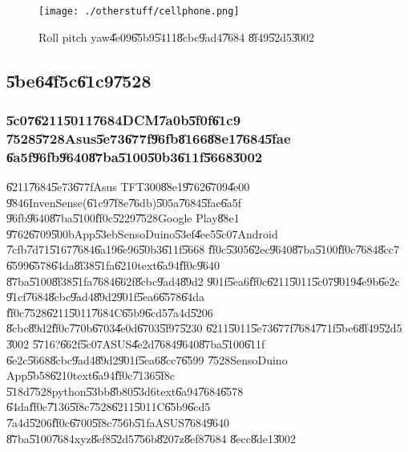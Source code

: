 \clearpage%

\begin{figure}[th]
\caption{Roll pitch yaw\U{4e09}\U{65b9}\U{5411}\U{8cbc}\U{9ad4}\U{7684}%
\U{8f49}\U{52d5}\U{3002}}
\begin{center}
\texttt{[image: ./otherstuff/cellphone.png]}
\end{center}
\end{figure}

\bigskip 

\subsection{\U{5be6}\U{4f5c}\U{61c9}\U{7528}}

\subsubsection{\U{5c07}\U{6211}\U{5011}\U{7684}DCM\U{7a0b}\U{5f0f}\U{61c9}%
\U{7528}\U{5728}Asus\U{5e73}\U{677f}\U{96fb}\U{8166}\U{88e1}\U{7684}\U{5fae}%
\U{6a5f}\U{96fb}\U{9640}\U{87ba}\U{5100}\U{50b3}\U{611f}\U{5668}\U{3002}}

\U{6211}\U{7684}\U{5e73}\U{677f}Asus TFT300\U{88e1}\U{9762}\U{6709}\U{4e00}%
\U{9846}InvenSense(\U{61c9}\U{7f8e}\U{76db})\U{505a}\U{7684}\U{5fae}\U{6a5f}%
\U{96fb}\U{9640}\U{87ba}\U{5100}\U{ff0c}\U{5229}\U{7528}Google Play\U{88e1}%
\U{9762}\U{6709}\U{500b}App\U{53eb}SensoDuino\U{53ef}\U{4ee5}\U{5c07}Android%
\U{7cfb}\U{7d71}\U{5167}\U{7684}\U{6a19}\U{6e96}\U{50b3}\U{611f}\U{5668}%
\U{ff0c}\U{5305}\U{62ec}\U{9640}\U{87ba}\U{5100}\U{ff0c}\U{7684}\U{8cc7}%
\U{6599}\U{6578}\U{64da}\U{8f38}\U{51fa}\U{6210}text\U{6a94}\U{ff0c}\U{9640}%
\U{87ba}\U{5100}\U{8f38}\U{51fa}\U{7684}\U{662f}\U{8cbc}\U{9ad4}\U{89d2}%
\U{901f}\U{5ea6}\U{ff0c}\U{6211}\U{5011}\U{5c07}\U{9019}\U{4e9b}\U{6e2c}%
\U{91cf}\U{7684}\U{8cbc}\U{9ad4}\U{89d2}\U{901f}\U{5ea6}\U{6578}\U{64da}%
\U{ff0c}\U{7528}\U{6211}\U{5011}\U{7684}C\U{65b9}\U{6cd5}\U{7a4d}\U{5206}%
\U{8cbc}\U{89d2}\U{ff0c}\U{770b}\U{6703}\U{4e0d}\U{6703}\U{5f97}\U{5230}%
\U{6211}\U{5011}\U{5e73}\U{677f}\U{7684}\U{771f}\U{5be6}\U{8f49}\U{52d5}%
\U{3002}\newline
\U{5716}?\U{662f}\U{5c07}ASUS\U{4e2d}\U{7684}\U{9640}\U{87ba}\U{5100}\U{611f}%
\U{6e2c}\U{5668}\U{8cbc}\U{9ad4}\U{89d2}\U{901f}\U{5ea6}\U{8cc7}\U{6599}%
\U{7528}SensoDuino App\U{5b58}\U{6210}text\U{6a94}\U{ff0c}\U{7136}\U{5f8c}%
\U{518d}\U{7528}python\U{53bb}\U{8b80}\U{53d6}text\U{6a94}\U{7684}\U{6578}%
\U{64da}\U{ff0c}\U{7136}\U{5f8c}\U{7528}\U{6211}\U{5011}C\U{65b9}\U{6cd5}%
\U{7a4d}\U{5206}\U{ff0c}\U{6700}\U{5f8c}\U{756b}\U{51fa}ASUS\U{7684}\U{9640}%
\U{87ba}\U{5100}\U{7684}xyz\U{8ef8}\U{52d5}\U{756b}\U{8207}z\U{8ef8}\U{7684}%
\U{8ecc}\U{8de1}\U{3002}

